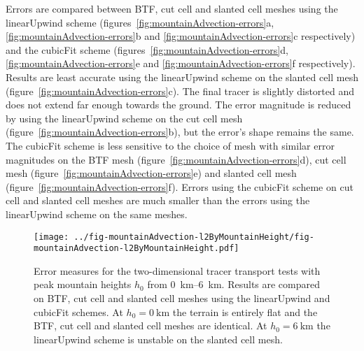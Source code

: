 Errors are compared between BTF, cut cell and slanted cell meshes using the linearUpwind scheme (figures~\ref{fig:mountainAdvection-errors}a, \ref{fig:mountainAdvection-errors}b and \ref{fig:mountainAdvection-errors}c respectively) and the cubicFit scheme (figures~\ref{fig:mountainAdvection-errors}d, \ref{fig:mountainAdvection-errors}e and \ref{fig:mountainAdvection-errors}f respectively).
Results are least accurate using the linearUpwind scheme on the slanted cell mesh (figure~\ref{fig:mountainAdvection-errors}c).  The final tracer is slightly distorted and does not extend far enough towards the ground.  The error magnitude is reduced by using the linearUpwind scheme on the cut cell mesh (figure~\ref{fig:mountainAdvection-errors}b), but the error's shape remains the same.
The cubicFit scheme is less sensitive to the choice of mesh with similar error magnitudes on the BTF mesh (figure~\ref{fig:mountainAdvection-errors}d), cut cell mesh (figure~\ref{fig:mountainAdvection-errors}e) and slanted cell mesh (figure~\ref{fig:mountainAdvection-errors}f).  Errors using the cubicFit scheme on cut cell and slanted cell meshes are much smaller than the errors using the linearUpwind scheme on the same meshes.

\begin{figure}
	\centering
	\texttt{[image: ../fig-mountainAdvection-l2ByMountainHeight/fig-mountainAdvection-l2ByMountainHeight.pdf]}
%
	\caption{Error measures for the two-dimensional tracer transport tests with peak mountain heights $h_0$ from \SIrange{0}{6}{\kilo\meter}.  Results are compared on BTF, cut cell and slanted cell meshes using the linearUpwind and cubicFit schemes.  At $h_0 = \SI{0}{\kilo\meter}$ the terrain is entirely flat and the BTF, cut cell and slanted cell meshes are identical.  At $h_0 = \SI{6}{\kilo\meter}$ the linearUpwind scheme is unstable on the slanted cell mesh.}
	\label{fig:mountainAdvection-l2ByMountainHeight}
\end{figure}

